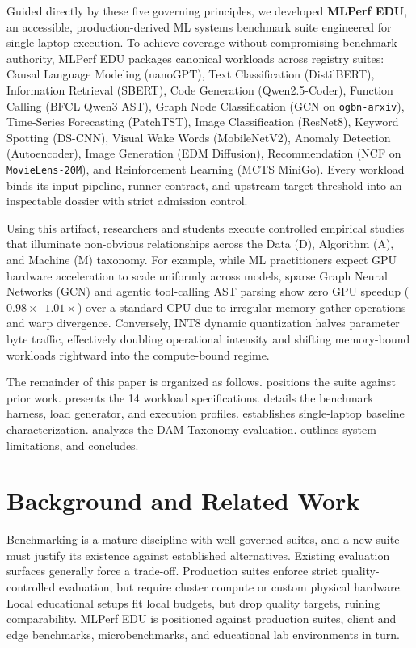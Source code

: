 \documentclass[10pt,twocolumn]{article}
\begin{document}
Guided directly by these five governing principles, we developed \textbf{MLPerf EDU}, an accessible, production-derived ML systems benchmark suite engineered for single-laptop execution. To achieve coverage without compromising benchmark authority, MLPerf EDU packages \RegistryRows{} canonical workloads across \RegistrySuites{} registry suites: Causal Language Modeling (nanoGPT), Text Classification (DistilBERT), Information Retrieval (SBERT), Code Generation (Qwen2.5-Coder), Function Calling (BFCL Qwen3 AST), Graph Node Classification (GCN on \texttt{ogbn-arxiv}), Time-Series Forecasting (PatchTST), Image Classification (ResNet8), Keyword Spotting (DS-CNN), Visual Wake Words (MobileNetV2), Anomaly Detection (Autoencoder), Image Generation (EDM Diffusion), Recommendation (NCF on \texttt{MovieLens-20M}), and Reinforcement Learning (MCTS MiniGo). Every workload binds its input pipeline, runner contract, and upstream target threshold into an inspectable dossier with strict admission control.

Using this artifact, researchers and students execute controlled empirical studies that illuminate non-obvious relationships across the Data (D), Algorithm (A), and Machine (M) taxonomy. For example, while ML practitioners expect GPU hardware acceleration to scale uniformly across models, sparse Graph Neural Networks (GCN) and agentic tool-calling AST parsing show zero GPU speedup ($0.98\times\text{--}1.01\times$) over a standard CPU due to irregular memory gather operations and warp divergence. Conversely, INT8 dynamic quantization halves parameter byte traffic, effectively doubling operational intensity and shifting memory-bound workloads rightward into the compute-bound regime.

The remainder of this paper is organized as follows.  positions the suite against prior work.  presents the 14 workload specifications.  details the benchmark harness, load generator, and execution profiles.  establishes single-laptop baseline characterization.  analyzes the DAM Taxonomy evaluation.  outlines system limitations, and  concludes.

\section{Background and Related Work}
\label{sec:related}

Benchmarking is a mature discipline with well-governed suites, and a new suite must justify its existence against established alternatives. Existing evaluation surfaces generally force a trade-off. Production suites enforce strict quality-controlled evaluation, but require cluster compute or custom physical hardware. Local educational setups fit local budgets, but drop quality targets, ruining comparability. MLPerf EDU is positioned against production suites, client and edge benchmarks, microbenchmarks, and educational lab environments in turn.
\end{document}
